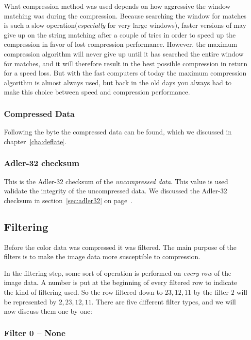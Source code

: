 What compression method was used depends on how aggressive the \lzone
window matching was during the  compression. Because searching
the \lzone window for matches is such a slow
operation(\textit{especially} for very large windows), faster versions
of  may give up on the string matching after a couple of tries
in order to speed up the compression in favor of lost compression
performance. However, the maximum compression algorithm will never
give up until it has searched the entire window for matches, and it
will therefore result in the best possible  compression in
return for a speed loss. But with the fast computers of today the
maximum compression algorithm is almost always used, but back in the
old days you always had to make this choice between speed and
compression performance.

\subsubsection{Compressed Data}

Following the \flg byte the  compressed data can be found,
which we discussed in chapter~\ref{cha:deflate}.

\subsubsection{Adler-32 checksum}

This is the Adler-32 checksum of the \textit{uncompressed data}. This
value is used validate the integrity of the uncompressed data. We
discussed the Adler-32 checksum in section~\ref{sec:adler32} on page~\pageref{sec:adler32}.

\subsection{Filtering}
\label{sec:png-filters}

Before the color data was compressed it was filtered. The main purpose
of the filters is to make the image data more susceptible to
compression.

In the filtering step, some sort of operation is performed on
\textit{every row} of the image data. A number is put at the beginning
of every filtered row to indicate the kind of filtering used. So the
row filtered down to $23,12,11$ by the filter $2$ will be represented
by $2, 23,12,11$. There are five different filter types, and we will
now discuss them one by one:

\subsubsection{Filter 0 -- None}

